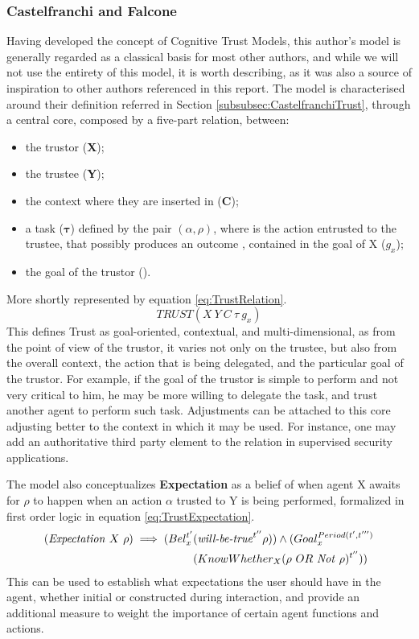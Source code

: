 \subsubsection{Castelfranchi and Falcone}
\label{subsubsec:Related work:Trust Models:Castelfranchi and Falcone}
Having developed the concept of Cognitive Trust Models, this author's model is generally regarded as a classical basis for most other authors, and while we will not use the entirety of this model, it is worth describing, as it was also a source of inspiration to other authors referenced in this report. 
The model is characterised around their definition referred in Section \ref{subsubsec:CastelfranchiTrust}, through a central core, composed by a five-part relation, between:
\begin{itemize}
	\item the trustor (\textbf{X});
	\item the trustee (\textbf{Y});
	\item the context where they are inserted in (\textbf{C});
	\item a task ($\bm{\tau}$) defined by the pair $(\alpha, \rho)$, where \bm{$\alpha$} is the action  entrusted to the trustee, that possibly produces an outcome \bm{$\rho$}, contained in the goal of X ($g_x$);
	\item the goal of the trustor ().
\end{itemize}
More shortly represented by equation \ref{eq:TrustRelation}.
\begin{equation}
TRUST(X\ Y\ C\ \tau\ g_x)
\label{eq:TrustRelation}
\end{equation}
This defines Trust as goal-oriented, contextual, and multi-dimensional, as from the point of view of the trustor, it varies not only on the trustee, but also from the overall context, the action that is being delegated, and the particular goal of the trustor. For example, if the goal of the trustor is simple to perform and not very critical to him, he may be more willing to delegate the task, and trust another agent to perform such task. Adjustments can be attached to this core adjusting better to the context in which it may be used. For instance, one may add an authoritative third party element to the relation in supervised security applications.

The model also conceptualizes \textbf{Expectation} as a belief of when agent X awaits for $\rho$ to happen when an action $\alpha$ trusted to Y is being performed, formalized in first order logic in equation \ref{eq:TrustExpectation}.
\begin{equation}
	\begin{aligned}
		(\text{\textit{Expectation}}\ X\ \rho) \implies (Bel_x^{t'} &(\text{\textit{will-be-true}} ^ {t''} \rho)) \wedge (Goal_x^{Period(t', t''')} \\
														&(KnowWhether_X (\rho\ OR\ \text{\textit{Not} } \rho)^{t''}))
	\end{aligned}
	\label{eq:TrustExpectation}
\end{equation}
This can be used to establish what expectations the user should have in the agent, whether initial or constructed during interaction, and provide an additional measure to weight the importance of certain agent functions and actions.

